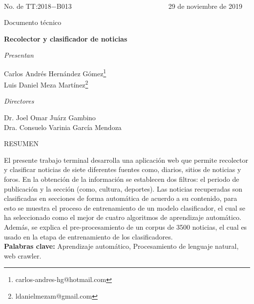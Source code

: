 \ \\[1cm]
No. de TT:2018$-$B013  
$\ \ \ \ \ \ \ \ \ \ \ \ \ \ \ \ \ \ \ \ \ \ \ \ \ \ \ \ \ \ \ \ \ \ \ \ \ \ \ \ \ \ \ \ \ \ \ \ \ \ \ \ \ \ \ \ \ \ \ \ \ $
29 de noviembre de 2019

\begin{center}

  \begin{large}
    Documento técnico\\[1cm]
  \end{large}

  \textbf{ \LARGE{R}\LARGE{ecolector} \LARGE{y} \LARGE{clasificador} \LARGE{de}  
  \LARGE{noticias}}\\[1cm]

  \begin{large}
    \textit{Presentan}\\[0.5cm]
  \end{large}

  \large{Carlos Andrés Hernández Gómez}\footnote{carlos-andres-hg@hotmail.com}\\
  \large{Luis Daniel Meza Martínez}\footnote{ldanielmezam@gmail.com}\\[0.5cm]

  \begin{large}
    \textit{Directores}\\[0.5cm]
  \end{large}

  \large{Dr. Joel Omar Juárz Gambino }\\
  \large{Dra. Consuelo Varinia García Mendoza }\\[0.5cm]

  \begin{large}
   RESUMEN\\[0.5cm]
  \end{large}


\end{center}

El presente trabajo terminal desarrolla una aplicación web que permite recolector y clasificar noticias de siete diferentes fuentes como, diarios, sitios de noticias y foros. En la obtención de la información se establecen dos filtros: el periodo de publicación y la sección (como, cultura, deportes). Las noticias recuperadas son clasificadas en secciones de forma automática de acuerdo a su contenido, para esto se muestra el proceso de entrenamiento de un modelo clasificador, el cual se ha seleccionado como el mejor de cuatro algoritmos de aprendizaje automático. Además, se explica el pre-procesamiento de un corpus de 3500 noticias, el cual es usado en la etapa de entrenamiento de los clasificadores.\\

\textbf{Palabras clave:} Aprendizaje automático, Procesamiento de lenguaje natural, web crawler.
